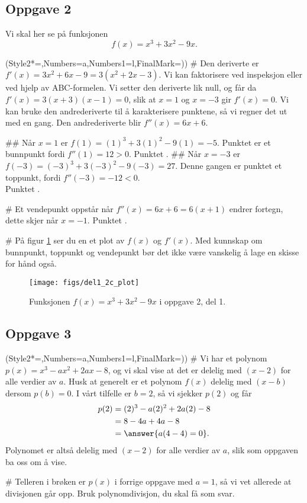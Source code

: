 \subsection*{Oppgave 2}
Vi skal her se på funksjonen 
\begin{equation*}
	f(x) = x^3 + 3x^2 - 9x.
\end{equation*}
\begin{easylist}[enumerate]
	\ListProperties(Style2*=,Numbers=a,Numbers1=l,FinalMark={)})
	# Den deriverte er $f'(x) = 3x^2 + 6x - 9 = 3(x^2 + 2x - 3)$.
	Vi kan faktorisere ved inspeksjon eller ved hjelp av ABC-formelen.
	Vi setter den deriverte lik null, og får da $f'(x) = 3(x+3)(x-1) = 0$, 
	slik at $x = 1$ og $x = -3$ gir $f'(x) = 0$.
	Vi kan bruke den andrederiverte til å karakterisere punktene,
	så vi regner det ut med en gang. Den andrederiverte blir $f''(x) = 6x+6$.
	
	## Når $x =1$ er $f(1) = (1)^3 + 3(1)^2 - 9(1) = -5$.
	Punktet er et bunnpunkt fordi $f''(1) = 12 > 0$.
	Punktet .
	## Når $x =-3$ er $f(-3) = (-3)^3 + 3(-3)^2 - 9(-3) = 27$.
	Denne gangen er punktet et toppunkt, fordi $f''(-3) = -12 < 0$. \\
	Punktet .
	
	# Et vendepunkt oppstår når $f''(x) = 6x+6 = 6(x+1)$ endrer fortegn,
	dette skjer når $x = -1$. Punktet .
	
	# På figur \ref{fig:del12cplot} ser du en et plot av $f(x)$ og $f'(x)$.
	Med kunnskap om bunnpunkt, toppunkt og vendepunkt bør det ikke være vanskelig å lage en skisse for hånd også.
	\begin{figure}[th!]
		\centering
		\texttt{[image: figs/del1\_2c\_plot]}
		\caption{Funksjonen $f(x) = x^3 + 3x^2 - 9x$ i oppgave 2, del 1.}
		\label{fig:del12cplot}
	\end{figure}
\end{easylist}

\subsection*{Oppgave 3}
\begin{easylist}[enumerate]
	\ListProperties(Style2*=,Numbers=a,Numbers1=l,FinalMark={)})
	# Vi har et polynom $p(x) = x^3 - ax^2 + 2ax - 8$, og vi skal vise at det er delelig
	med $(x-2)$ for alle verdier av $a$. Husk at generelt er et polynom $f(x)$ delelig med $(x-b)$ dersom $p(b) = 0$. I vårt tilfelle er $b = 2$, så vi sjekker $p(2)$ og får
	\begin{align*}
		p(2) &= (2)^3 - a(2)^2 + 2a(2) - 8 \\
		&= 8 - 4a + 4a - 8 \\
		&= \answer{a(4-4) = 0}.
	\end{align*}
	Polynomet er altså delelig med $(x-2)$ for alle verdier av $a$, slik som oppgaven ba oss om å vise.
	
	# Telleren i brøken er $p(x)$ i forrige oppgave med $a = 1$, så vi vet allerede at divisjonen går opp.
	Bruk polynomdivisjon, du skal få  som svar. 
\end{easylist}

